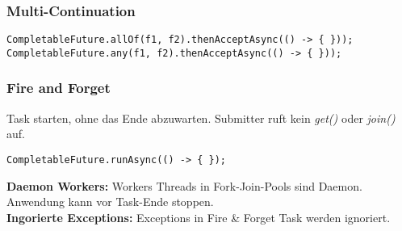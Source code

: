 \subsubsection{Multi-Continuation}
\begin{lstlisting}
CompletableFuture.allOf(f1, f2).thenAcceptAsync(() -> { }));
CompletableFuture.any(f1, f2).thenAcceptAsync(() -> { }));
\end{lstlisting}

\subsubsection{Fire and Forget}
Task starten, ohne das Ende abzuwarten. Submitter ruft kein \textit{get()} oder \textit{join()} auf.
\begin{lstlisting}
CompletableFuture.runAsync(() -> { });
\end{lstlisting}
\textbf{Daemon Workers:} Workers Threads in Fork-Join-Pools sind Daemon.
Anwendung kann vor Task-Ende stoppen.\\ 
\textbf{Ingorierte Exceptions:} Exceptions in Fire \& Forget Task werden ignoriert.
